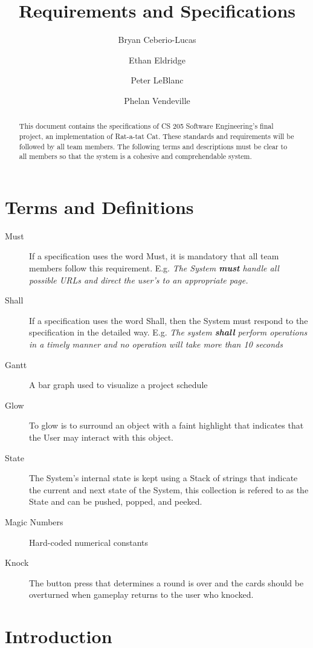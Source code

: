 \documentclass[12pt]{IEEEtran}
\title{Requirements and Specifications}
\author{Bryan Ceberio-Lucas \and Ethan Eldridge \and Peter LeBlanc \and Phelan Vendeville }
\begin{document}
\maketitle

\begin{abstract}
	This document contains the specifications of CS 205 Software  Engineering's final project, an implementation of Rat-a-tat Cat. These standards and requirements will be followed by all team members. The 			following terms and descriptions must be clear to all members so that the system is a cohesive and comprehendable system.
\end{abstract}

\tableofcontents

\section{Terms and Definitions}
\label{sec:TermsDefinitions}
	\begin{description}
		\item[Must] If a specification uses the word Must, it is mandatory that all team members follow this requirement. E.g.  \textit{The System \textbf{must} handle all possible URLs and direct the user's to an 				appropriate page.} 
		\item[Shall] If a specification uses the word Shall, then the System must respond to the specification in the detailed way. E.g. \textit{The system \textbf{shall} perform operations in a timely manner and 				no operation will take more than 10 seconds}
		\item[Gantt] A bar graph used to visualize a project schedule
		\item[Glow] To glow is to surround an object with a faint highlight that indicates that the User may interact with this object.
		\item[State] The System's internal state is kept using a Stack of strings that indicate the current and next state of the System, this collection is refered to as the State and can be pushed, popped, and 				peeked.
		\item[Magic Numbers] \hspace{4em} Hard-coded numerical constants 
		\item[Knock] The button press that determines a round is over and the cards should be overturned when gameplay returns to the user who knocked.
	\end{description}

\section{Introduction}
\label{sec:introduction}
\end{document}
